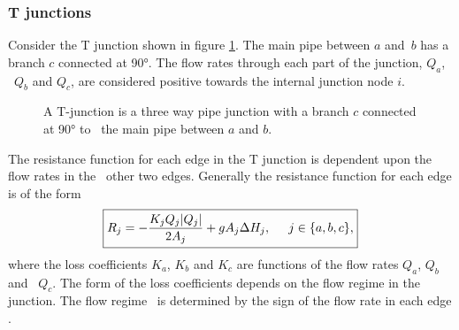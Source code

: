 \subsubsection{T junctions}

Consider the T junction shown in figure \ref{fig:t_junction_diagram}. The main pipe between $a$ and\
$b$ has a branch $c$ connected at 90°. The flow rates through each part of the junction, $Q_a$, \ 
$Q_b$ and $Q_c$, are considered positive towards the internal junction node $i$. 

\begin{figure}
    \centering
    \caption{A T-junction is a three way pipe junction with a branch $c$ connected at 90° to 
    \ the main pipe between $a$ and $b$.}
    \label{fig:t_junction_diagram}
\end{figure}

The resistance function for each edge in the T junction is dependent upon the flow rates in the \
other two edges. Generally the resistance function for each edge is of the form
\begin{align}\label{eq:t_junction_resistance}
    \boxed{ R_j = - \frac{K_j Q_j |Q_j|}{2 A_j} + g A_j \Delta H_j, \hspace{0.5cm} j \in \{a,b,c\}, }
\end{align}
where the loss coefficients $K_a$, $K_b$ and $K_c$ are functions of the flow rates $Q_a$, $Q_b$ and \
$Q_c$. The form of the loss coefficients depends on the flow regime in the junction. The flow regime \
is determined by the sign of the flow rate in each edge \cite{rennels22}.

